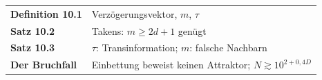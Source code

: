 \begin{merksatz}
\begin{center}
\renewcommand{\arraystretch}{1.5}
\begin{tabular}{@{}P{3.0cm}P{5.6cm}@{}}
\toprule
\textbf{Definition 10.1} & Verzögerungsvektor, $m$, $\tau$\\
\textbf{Satz 10.2} & Takens: $m \ge 2d + 1$ genügt\\
\textbf{Satz 10.3} & $\tau$: Transinformation; $m$: falsche Nachbarn\\
\textbf{Der Bruchfall} & Einbettung beweist keinen Attraktor; $N \gtrsim 10^{2+0{,}4D}$\\
\bottomrule
\end{tabular}
\end{center}

\begin{center}
\begin{minipage}{0.88\textwidth}
\end{minipage}
\end{center}
\end{merksatz}
